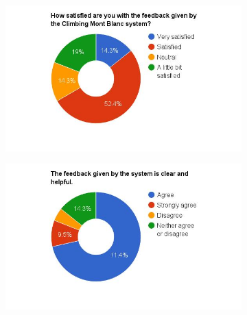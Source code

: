 \begin{figure}
    \centering
    \begin{subfigure}[h]{0.48\textwidth}
        \centerline{\includegraphics[width=1.5\textwidth]{results/feedback_cmb.jpg}}
        \caption{}
        \label{fig:cmb-feedback}
    \end{subfigure}
    \hfill
    \begin{subfigure}[h]{0.48\textwidth}
        \centerline{\includegraphics[width=1.5\textwidth]{results/clear_feedback_cmb.jpg}}
        \caption{}
        \label{fig:cmb-feedback-clear}
    \end{subfigure}


\end{figure}
